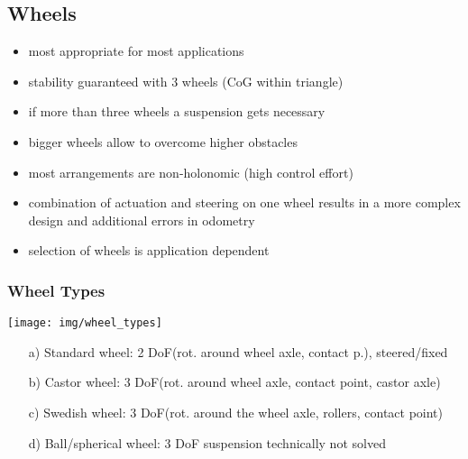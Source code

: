 \documentclass[fontsize=6pt]{scrartcl}
\begin{document}
\begin{multicols*}{4}
\begin{itemize}
\end{itemize}

\subsection*{Wheels}
\begin{itemize}
	\item most appropriate for most applications
	\item stability guaranteed with 3 wheels (CoG within triangle)
	\item if more than three wheels a suspension gets necessary
	\item bigger wheels allow to overcome higher obstacles
	\item most arrangements are non-holonomic (high control effort)
	\item combination of actuation and steering on one wheel results in a more complex design and additional errors in odometry
	\item selection of wheels is application dependent
\end{itemize}

\subsubsection*{Wheel Types}

{\centering
	\texttt{[image: img/wheel\_types]}
\par}

\begin{enumerate}
	\item[a)] Standard wheel: 2 DoF(rot. around wheel axle, contact p.), steered/fixed
	\item[b)] Castor wheel: 3 DoF(rot. around wheel axle, contact point, castor axle) 
	\item[c)] Swedish wheel: 3 DoF(rot. around the wheel axle, rollers, contact point) 
	\item[d)] Ball/spherical wheel:	3 DoF suspension technically not solved
\end{enumerate}


\end{multicols*}
\end{document}
